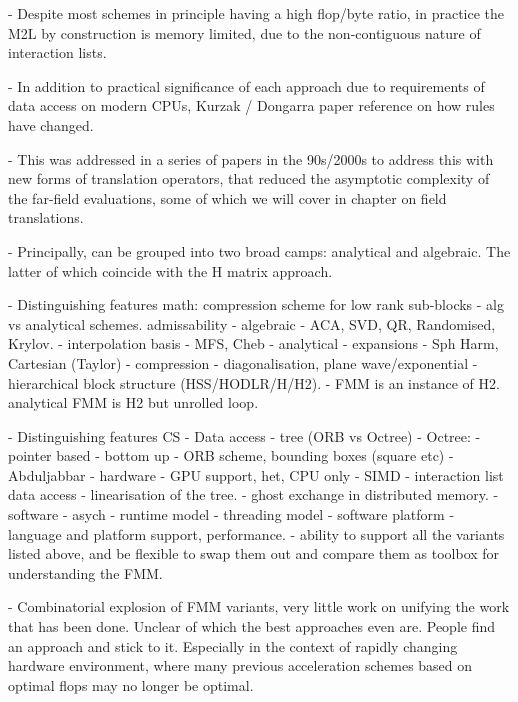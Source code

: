 - Despite most schemes in principle having a high flop/byte ratio, in practice the M2L by construction is memory limited, due to the non-contiguous nature of interaction lists.

- In addition to practical significance of each approach due to requirements of data access on modern CPUs, Kurzak / Dongarra paper reference on how rules have changed.

- This was addressed in a series of papers in the 90s/2000s to address this with new forms of translation operators, that reduced the asymptotic complexity of the far-field evaluations, some of which we will cover in chapter on field translations.

- Principally, can be grouped into two broad camps: analytical and algebraic. The latter of which coincide with the H matrix approach.

- Distinguishing features math: compression scheme for low rank sub-blocks
    - alg vs analytical schemes. admissability
        - algebraic
            - ACA, SVD, QR, Randomised, Krylov.
            - interpolation basis
                - MFS, Cheb
        - analytical
            - expansions
                - Sph Harm, Cartesian (Taylor)
            - compression
                - diagonalisation, plane wave/exponential
    - hierarchical block structure (HSS/HODLR/H/H2).
        - FMM is an instance of H2. analytical FMM is H2 but unrolled loop.

- Distinguishing features CS
    - Data access
    - tree (ORB vs Octree)
        - Octree:
            - pointer based
            - bottom up
        - ORB scheme, bounding boxes (square etc)
            - Abduljabbar
    - hardware
        - GPU support, het, CPU only
        - SIMD
    - interaction list data access
        - linearisation of the tree.
        - ghost exchange in distributed memory.
    - software
        - asych
        - runtime model
        - threading model
    - software platform
        - language and platform support, performance.
        - ability to support all the variants listed above, and be flexible to swap them out and compare them as toolbox for understanding the FMM.

- Combinatorial explosion of FMM variants, very little work on unifying the work that has been done. Unclear of which the best approaches even are. People find an approach and stick to it. Especially in the context of rapidly changing hardware environment, where many previous acceleration schemes based on optimal flops may no longer be optimal.

